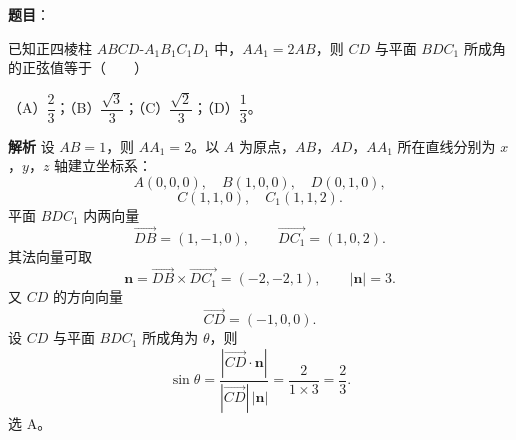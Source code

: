 \begin{answer}

\textbf{题目}：

已知正四棱柱 $ABCD\text{-}A_1B_1C_1D_1$ 中，$AA_1=2AB$，则 $CD$ 与平面 $BDC_1$ 所成角的正弦值等于\mbox{（　　）}

（A）$\dfrac23$；（B）$\dfrac{\sqrt3}3$；（C）$\dfrac{\sqrt2}3$；（D）$\dfrac13$。

\textbf{解析}
设 $AB=1$，则 $AA_1=2$。以 $A$ 为原点，$AB$，$AD$，$AA_1$ 所在直线分别为 $x$，$y$，$z$ 轴建立坐标系：
\nopagebreak[4]
\[A(0,0,0),\quad B(1,0,0),\quad D(0,1,0),\]
\nopagebreak[4]
\[C(1,1,0),\quad C_1(1,1,2).\]
平面 $BDC_1$ 内两向量
\nopagebreak[4]
\[\overrightarrow{DB}=(1,-1,0),\qquad
\overrightarrow{DC_1}=(1,0,2).\]
其法向量可取
\nopagebreak[4]
\[\boldsymbol n=\overrightarrow{DB}\times\overrightarrow{DC_1}
=(-2,-2,1),\qquad|\boldsymbol n|=3.\]
又 $CD$ 的方向向量
\nopagebreak[4]
\[\overrightarrow{CD}=(-1,0,0).\]
设 $CD$ 与平面 $BDC_1$ 所成角为 $\theta$，则
\nopagebreak[4]
\[\sin\theta
=\frac{\left|\overrightarrow{CD}\cdot\boldsymbol n\right|}
{|\overrightarrow{CD}|\,|\boldsymbol n|}
=\frac{2}{1\times3}=\frac23.\]
选 A。


\end{answer}
